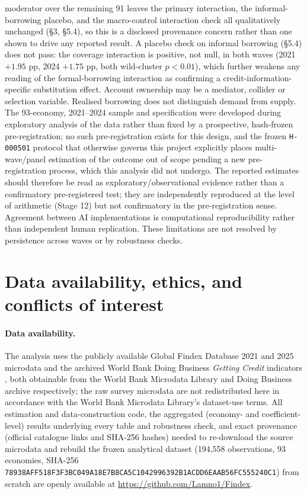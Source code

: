 moderator over the remaining 91 leaves the primary interaction, the informal-borrowing
placebo, and the macro-control interaction check all qualitatively unchanged (\S3, \S5.4),
so this is a disclosed provenance concern rather than one shown to drive any reported
result. A placebo check on informal borrowing (\S5.4) does not pass: the coverage
interaction is positive, not null, in both waves (2021 $+1.95$ pp, 2024 $+1.75$ pp,
both wild-cluster $p<0.01$), which further weakens any reading of the formal-borrowing
interaction as confirming a credit-information-specific substitution effect. Account
ownership may be a mediator, collider or selection variable. Realised
borrowing does not distinguish demand from supply. The 93-economy, 2021--2024 sample and specification were developed
during exploratory analysis of the data rather than fixed by a prospective, hash-frozen
pre-registration; no such pre-registration exists for this design, and the frozen
\texttt{H-000501} protocol that otherwise governs this project explicitly places
multi-wave/panel estimation of the outcome out of scope pending a new pre-registration
process, which this analysis did not undergo. The reported estimates should therefore be
read as exploratory/observational evidence rather than a confirmatory pre-registered test;
they are independently reproduced at the level of arithmetic (Stage 12) but not
confirmatory in the pre-registration sense. Agreement between AI implementations is
computational reproducibility rather than independent human replication. These
limitations are not resolved by persistence across waves or by robustness checks.

\section*{Data availability, ethics, and conflicts of interest}

\paragraph{Data availability.} The analysis uses the publicly available Global Findex
Database 2021 and 2025 microdata \citep{WorldBankFindexMicrodata2025} and the archived
World Bank Doing Business \emph{Getting Credit} indicators
\citep{WorldBankDoingBusinessArchive}, both obtainable from the World Bank Microdata
Library and Doing Business archive respectively; the raw survey microdata are not
redistributed here in accordance with the World Bank Microdata Library's dataset-use
terms. All estimation and data-construction code, the aggregated (economy- and
coefficient-level) results underlying every table and robustness check, and exact
provenance (official catalogue links and SHA-256 hashes) needed to re-download the source
microdata and rebuild the frozen analytical dataset (194,558 observations, 93 economies,
SHA-256 \texttt{78938AFF518F3F3BC049A18E7B8CA5C1042996392B1ACDD6EAAB56FC555240C1}) from
scratch are openly available at \url{https://github.com/Lamno1/Findex}.

